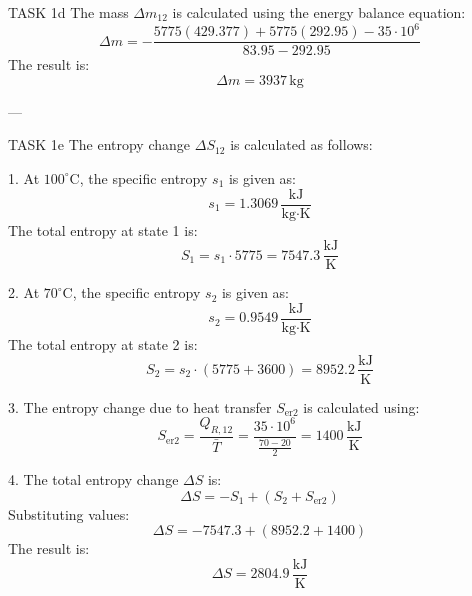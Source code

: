 TASK 1d  
The mass \( \Delta m_{12} \) is calculated using the energy balance equation:  
\[
\Delta m = - \frac{5775 (429.377) + 5775 (292.95) - 35 \cdot 10^6}{83.95 - 292.95}
\]  
The result is:  
\[
\Delta m = 3937 \, \text{kg}
\]  

---

TASK 1e  
The entropy change \( \Delta S_{12} \) is calculated as follows:  

1. At \( 100^\circ\text{C} \), the specific entropy \( s_1 \) is given as:  
\[
s_1 = 1.3069 \, \frac{\text{kJ}}{\text{kg·K}}
\]  
The total entropy at state 1 is:  
\[
S_1 = s_1 \cdot 5775 = 7547.3 \, \frac{\text{kJ}}{\text{K}}
\]  

2. At \( 70^\circ\text{C} \), the specific entropy \( s_2 \) is given as:  
\[
s_2 = 0.9549 \, \frac{\text{kJ}}{\text{kg·K}}
\]  
The total entropy at state 2 is:  
\[
S_2 = s_2 \cdot (5775 + 3600) = 8952.2 \, \frac{\text{kJ}}{\text{K}}
\]  

3. The entropy change due to heat transfer \( S_{\text{er2}} \) is calculated using:  
\[
S_{\text{er2}} = \frac{Q_{R,12}}{\bar{T}} = \frac{35 \cdot 10^6}{\frac{70 - 20}{2}} = 1400 \, \frac{\text{kJ}}{\text{K}}
\]  

4. The total entropy change \( \Delta S \) is:  
\[
\Delta S = -S_1 + (S_2 + S_{\text{er2}})
\]  
Substituting values:  
\[
\Delta S = -7547.3 + (8952.2 + 1400)
\]  
The result is:  
\[
\Delta S = 2804.9 \, \frac{\text{kJ}}{\text{K}}
\]  